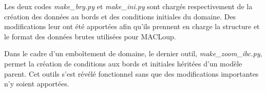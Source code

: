 \documentclass[10pt,a4paper,titlepage]{article}
\begin{document}
    Les deux codes \textit{make\_bry.py} et \textit{make\_ini.py} sont chargés respectivement de la création des données au bords et des conditions initiales du domaine.
    Des modifications leur ont été apportées afin qu'ils prennent en charge la structure et le format des données brutes utilisées pour MACLoup.
    
    Dans le cadre d'un emboîtement de domaine, le dernier outil, \textit{make\_zoom\_ibc.py}, permet la création de conditions aux bords et initiales héritées d'un modèle parent.
    Cet outils s'est révélé fonctionnel sans que des modifications importantes n'y soient apportées.
    
    
    
    
    
    
    
    
    
    
    
    
    
\end{document}
